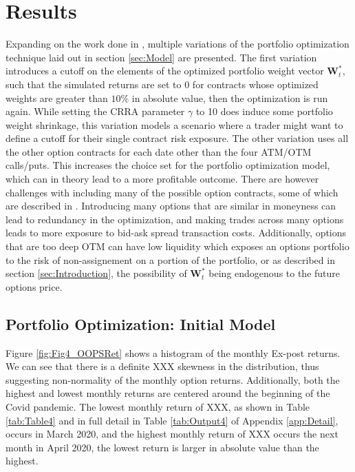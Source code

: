 \section{Results}\label{sec:Results}
Expanding on the work done in \cite{faias2017optimal}, multiple variations of the portfolio optimization technique laid out in section \ref{sec:Model} are presented. The first variation introduces a cutoff on the elements of the optimized portfolio weight vector $\mathbf{W}_{t}^{*}$, such that the simulated returns are set to $0$ for contracts whose optimized weights are greater than $10\%$ in absolute value, then the optimization is run again. While setting the CRRA parameter $\gamma$ to 10 does induce some portfolio weight shrinkage, this variation models a scenario where a trader might want to define a cutoff for their single contract risk exposure. The other variation uses all the other option contracts for each date other than the four ATM/OTM calls/puts. This increases the choice set for the portfolio optimization model, which can in theory lead to a more profitable outcome. There are however challenges with including many of the possible option contracts, some of which are described in \cite{faias2017optimal}. Introducing many options that are similar in moneyness can lead to redundancy in the optimization, and making trades across many options leads to more exposure to bid-ask spread transaction costs. Additionally, options that are too deep OTM can have low liquidity which exposes an options portfolio to the risk of non-assignement on a portion of the portfolio, or as described in section \ref{sec:Introduction}, the possibility of $\mathbf{W}_{t}^{*}$ being endogenous to the future options price.

\subsection{Portfolio Optimization: Initial Model}\label{sec:PortOpt}

Figure \ref{fig:Fig4_OOPSRet} shows a histogram of the monthly Ex-post returns. We can see that there is a definite XXX skewness in the distribution, thus suggesting non-normality of the monthly option returns. Additionally, both the highest and lowest monthly returns are centered around the beginning of the Covid pandemic. The lowest monthly return of XXX, as shown in Table \ref{tab:Table4} and in full detail in Table \ref{tab:Output4} of Appendix \ref{app:Detail}, occurs in March 2020, and the highest monthly return of XXX occurs the next month in April 2020, the lowest return is larger in absolute value than the highest.

